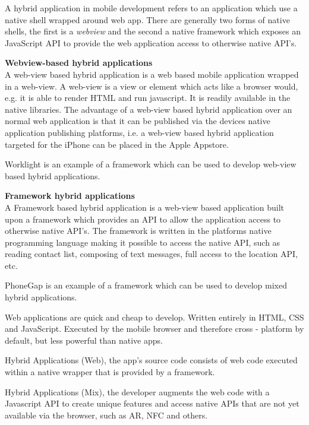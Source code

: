 
A hybrid application in mobile development refers to an application which use a native shell wrapped around web app. There are generally two forms of native shells, the first is a \emph{webview} and the second a native framework which exposes an JavaScript API to provide the web application access to otherwise native API's.

{\bf Webview-based hybrid applications}\\
A web-view based hybrid application is a web based mobile application wrapped in a web-view. A web-view is a view or element which acts like a browser would, e.g. it is able to render HTML and run javascript.  It is readily available in the native libraries. The advantage of a web-view based hybrid application over an normal web application is that it can be published via the devices native application publishing platforms, i.e. a web-view based hybrid application targeted for the iPhone can be placed in the Apple Appstore. 

Worklight is an example of a framework which can be used to develop web-view based hybrid applications.

{\bf Framework hybrid applications}\\
A Framework based hybrid application is a web-view based application built upon a framework which provides an API to allow the application access to otherwise native API's. The framework is written in the platforms native programming language making it possible to access the native API, such as reading contact list, composing of text messages, full access to the location API, etc.

PhoneGap is an example of a framework which can be used to develop mixed hybrid applications.

Web applications are quick and cheap to develop. Written entirely in HTML, CSS and JavaScript. Executed by the mobile
browser and therefore cross - platform by default, but less powerful than native apps.
 
Hybrid Applications (Web), the app's source code consists of web code executed within a native wrapper that is provided by a framework.
 
Hybrid Applications (Mix), the developer augments the web code with a Javascript API to create unique features and
access native APIs that are not yet available via the browser, such as AR, NFC and others.
 
